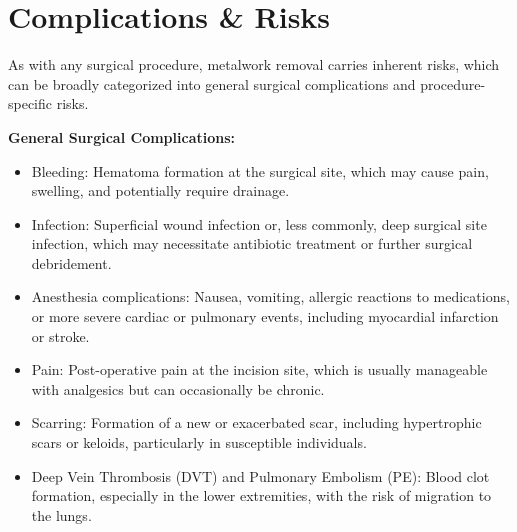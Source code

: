 \section*{Complications \& Risks}
As with any surgical procedure, metalwork removal carries inherent risks, which can be broadly categorized into general surgical complications and procedure-specific risks.

\textbf{General Surgical Complications:}
\begin{itemize}
  \item Bleeding: Hematoma formation at the surgical site, which may cause pain, swelling, and potentially require drainage.
  \item Infection: Superficial wound infection or, less commonly, deep surgical site infection, which may necessitate antibiotic treatment or further surgical debridement.
  \item Anesthesia complications: Nausea, vomiting, allergic reactions to medications, or more severe cardiac or pulmonary events, including myocardial infarction or stroke.
  \item Pain: Post-operative pain at the incision site, which is usually manageable with analgesics but can occasionally be chronic.
  \item Scarring: Formation of a new or exacerbated scar, including hypertrophic scars or keloids, particularly in susceptible individuals.
  \item Deep Vein Thrombosis (DVT) and Pulmonary Embolism (PE): Blood clot formation, especially in the lower extremities, with the risk of migration to the lungs.
\end{itemize}

